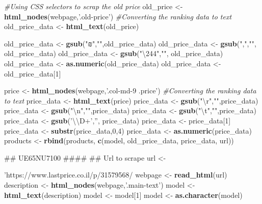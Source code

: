 \documentclass[]{article}
\newenvironment{Shaded}{\begin{snugshade}}{\end{snugshade}}
\newcommand{\KeywordTok}[1]{\textcolor[rgb]{0.13,0.29,0.53}{\textbf{#1}}}
\newcommand{\DecValTok}[1]{\textcolor[rgb]{0.00,0.00,0.81}{#1}}
\newcommand{\CharTok}[1]{\textcolor[rgb]{0.31,0.60,0.02}{#1}}
\newcommand{\StringTok}[1]{\textcolor[rgb]{0.31,0.60,0.02}{#1}}
\newcommand{\CommentTok}[1]{\textcolor[rgb]{0.56,0.35,0.01}{\textit{#1}}}
\newcommand{\NormalTok}[1]{#1}
\begin{document}
\begin{Shaded}
\begin{Highlighting}[]
{{{\CommentTok{#Using CSS selectors to scrap the old price}
\NormalTok{old_price <-}\StringTok{ }\KeywordTok{html_nodes}\NormalTok{(webpage,}\StringTok{'.old-price'}\NormalTok{)}
\CommentTok{#Converting the ranking data to text }
\NormalTok{old_price_data <-}\StringTok{ }\KeywordTok{html_text}\NormalTok{(old_price)}

\NormalTok{old_price_data <-}\StringTok{ }\KeywordTok{gsub}\NormalTok{(}\StringTok{"₪"}\NormalTok{,}\StringTok{""}\NormalTok{,old_price_data)}
\NormalTok{old_price_data <-}\StringTok{ }\KeywordTok{gsub}\NormalTok{(}\StringTok{","}\NormalTok{,}\StringTok{""}\NormalTok{, old_price_data)}
\NormalTok{old_price_data <-}\StringTok{ }\KeywordTok{gsub}\NormalTok{(}\StringTok{"\textbackslash{}244"}\NormalTok{,}\StringTok{""}\NormalTok{, old_price_data)}
\NormalTok{old_price_data <-}\StringTok{ }\KeywordTok{as.numeric}\NormalTok{(old_price_data)}
\NormalTok{old_price_data <-}\StringTok{ }\NormalTok{old_price_data[}\DecValTok{1}\NormalTok{]}

\NormalTok{price <-}\StringTok{ }\KeywordTok{html_nodes}\NormalTok{(webpage,}\StringTok{'.col-md-9 .price'}\NormalTok{)}
\CommentTok{#Converting the ranking data to text }
\NormalTok{price_data <-}\StringTok{ }\KeywordTok{html_text}\NormalTok{(price)}
\NormalTok{price_data <-}\StringTok{ }\KeywordTok{gsub}\NormalTok{(}\StringTok{"}\CharTok{\textbackslash{}r}\StringTok{"}\NormalTok{,}\StringTok{""}\NormalTok{,price_data) }
\NormalTok{price_data <-}\StringTok{ }\KeywordTok{gsub}\NormalTok{(}\StringTok{"}\CharTok{\textbackslash{}n}\StringTok{"}\NormalTok{,}\StringTok{""}\NormalTok{,price_data) }
\NormalTok{price_data <-}\StringTok{ }\KeywordTok{gsub}\NormalTok{(}\StringTok{"}\CharTok{\textbackslash{}t}\StringTok{"}\NormalTok{,}\StringTok{""}\NormalTok{,price_data) }
\NormalTok{price_data <-}\StringTok{ }\KeywordTok{gsub}\NormalTok{(}\StringTok{'}\CharTok{\textbackslash{}\textbackslash{}}\StringTok{D+'}\NormalTok{,}\StringTok{''}\NormalTok{, price_data)}
\NormalTok{price_data <-}\StringTok{ }\NormalTok{price_data[}\DecValTok{1}\NormalTok{]}
\NormalTok{price_data <-}\StringTok{ }\KeywordTok{substr}\NormalTok{(price_data,}\DecValTok{0}\NormalTok{,}\DecValTok{4}\NormalTok{)}
\NormalTok{price_data <-}\StringTok{ }\KeywordTok{as.numeric}\NormalTok{(price_data)}
\NormalTok{products <-}\StringTok{ }\KeywordTok{rbind}\NormalTok{(products, }\KeywordTok{c}\NormalTok{(model, old_price_data, price_data, url))}

\NormalTok{## UE65NU7100 ####}
\NormalTok{## Url to scrape}
\NormalTok{url <-}\StringTok{'https://www.lastprice.co.il/p/31579568/%D7%98%D7%9C%D7%95%D7%95%D7%99%D7%96%D7%99%D7%94-65-Samsung/Samsung-UE65NU7100'}
\NormalTok{webpage <-}\StringTok{ }\KeywordTok{read_html}\NormalTok{(url) }
\NormalTok{description <-}\StringTok{ }\KeywordTok{html_nodes}\NormalTok{(webpage,}\StringTok{'.main-text'}\NormalTok{)}
\NormalTok{model <-}\StringTok{ }\KeywordTok{html_text}\NormalTok{(description)}
\NormalTok{model <-}\StringTok{ }\NormalTok{model[}\DecValTok{1}\NormalTok{]}
\NormalTok{model <-}\StringTok{ }\KeywordTok{as.character}\NormalTok{(model)}

}}}}
\end{Highlighting}
\end{Shaded}
\end{document}
